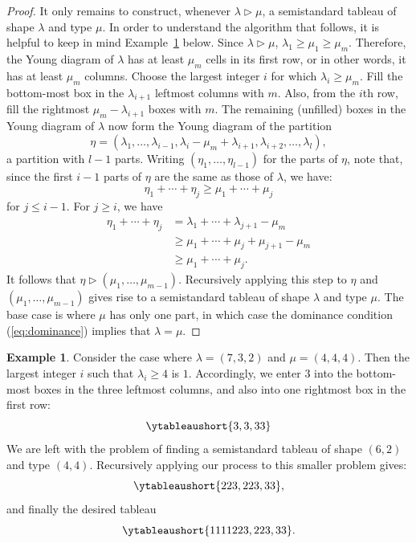 \documentclass[11pt]{amsproc}
\theoremstyle{definition}
\theoremstyle{example}
\newtheorem{example}[theorem]{Example}
\begin{document}
\begin{proof}
  It only remains to construct, whenever $\lambda\rhd\mu$, a semistandard tableau of shape $\lambda$ and type $\mu$.
  In order to understand the algorithm that follows, it is helpful to keep in mind Example~\ref{example:can-tab} below.
  Since $\lambda\rhd\mu$, $\lambda_1\geq \mu_1\geq \mu_m$.
  Therefore, the Young diagram of $\lambda$ has at least $\mu_m$ cells in its first row, or in other words, it has at least $\mu_m$ columns.
  Choose the largest integer $i$ for which $\lambda_i\geq\mu_m$.
  Fill the bottom-most box in the $\lambda_{i+1}$ leftmost columns with $m$.
  Also, from the $i$th row, fill the rightmost $\mu_m-\lambda_{i+1}$ boxes with $m$.
  The remaining (unfilled) boxes in the Young diagram of $\lambda$ now form the Young diagram of the partition
  \begin{displaymath}
  \eta=(\lambda_1,\dotsc,\lambda_{i-1}, \lambda_i - \mu_m + \lambda_{i+1}, \lambda_{i+2},\dotsc,\lambda_l), 
  \end{displaymath}
  a partition with $l-1$ parts.
  Writing $(\eta_1,\dotsc,\eta_{l-1})$ for the parts of $\eta$, note that, since the first $i-1$ parts of $\eta$ are the same as those of $\lambda$,
  we have:
  \begin{displaymath}
    \eta_1+\dotsb + \eta_j\geq \mu_1 + \dotsb + \mu_j
  \end{displaymath}
  for $j\leq i-1$.
  For $j\geq i$, we have
  \begin{align*}
    \eta_1 + \dotsb + \eta_j & = \lambda_1 + \dotsb + \lambda_{j+1} -\mu_m\\
                             & \geq \mu_1 + \dotsb + \mu_j + \mu_{j+1} - \mu_m\\
                             & \geq \mu_1 + \dotsb + \mu_j.
  \end{align*}
  It follows that $\eta\rhd (\mu_1,\dotsc,\mu_{m-1})$.
  Recursively applying this step to $\eta$ and $(\mu_1,\dotsc,\mu_{m-1})$ gives rise to a semistandard tableau of shape $\lambda$ and type $\mu$.
  The base case is where $\mu$ has only one part, in which case the dominance condition (\ref{eq:dominance}) implies that $\lambda=\mu$.
\end{proof}
\begin{example}
  \label{example:can-tab}
  Consider the case where $\lambda=(7,3,2)$ and $\mu=(4,4,4)$.
  Then the largest integer $i$ such that $\lambda_i\geq 4$ is $1$.
  Accordingly, we enter $3$ into the bottom-most boxes in the three leftmost columns, and also into one rightmost box in the first row:
  \begin{displaymath}
    \ytableaushort{{}{}{}{}{}{}3,{}{}3,33}
  \end{displaymath}
  We are left with the problem of finding a semistandard tableau of shape $(6,2)$ and type $(4,4)$.
  Recursively applying our process to this smaller problem gives:
  \begin{displaymath}
    \ytableaushort{{}{}{}{}223,223,33},
  \end{displaymath}
  and finally the desired tableau
  \begin{displaymath}
    \ytableaushort{1111223,223,33}.
  \end{displaymath}
\end{example}
\end{document}

